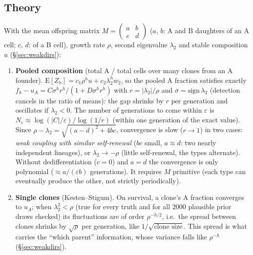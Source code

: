 \documentclass[10pt,a4paper]{article}
\begin{document}
\subsection{Theory}
With the mean offspring matrix $M = \begin{pmatrix} a & b\\ c & d\end{pmatrix}$ ($a$, $b$: A and B daughters of an A cell; $c$, $d$: of a B cell), growth rate $\rho$, second eigenvalue $\lambda_2$ and stable composition $u$ (\S\ref{sec:weakdirs}):
\begin{enumerate}
\item \textbf{Pooled composition} (total A / total cells over many clones from an A founder). $\mathrm E[Z_h] = c_1 \rho^h u + c_2 \lambda_2^h w_2$, so the pooled A fraction satisfies exactly $f_h - u_A = C\sigma^h r^h/(1 + D\sigma^h r^h)$ with $r = |\lambda_2|/\rho$ and $\sigma = \mathrm{sign}\,\lambda_2$ (detection cancels in the ratio of means): the gap shrinks by $r$ per generation and oscillates if $\lambda_2 < 0$. The number of generations to come within $\varepsilon$ is $N_\varepsilon \approx \log(|C|/\varepsilon)/\log(1/r)$ (within one generation of the exact value). Since $\rho - \lambda_2 = \sqrt{(a-d)^2 + 4bc}$, convergence is slow ($r \to 1$) in two cases: \emph{weak coupling with similar self-renewal} ($bc$ small, $a \approx d$: two nearly independent lineages), or $\lambda_2 \to -\rho$ (little self-renewal, the types alternate). Without dedifferentiation ($c = 0$) and $a = d$ the convergence is only polynomial ($\approx a/(\varepsilon b)$ generations). It requires $M$ primitive (each type can eventually produce the other, not strictly periodically).
\item \textbf{Single clones} (Kesten--Stigum). On survival, a clone's A fraction converges to $u_A$; when $\lambda_2^2 < \rho$ (true for every truth and for all 2000 plausible prior draws checked) its fluctuations are of order $\rho^{-h/2}$, i.e.\ the spread between clones shrinks by $\sqrt\rho$ per generation, like $1/\sqrt{\text{clone size}}$. This spread is what carries the ``which parent'' information, whose variance falls like $\rho^{-h}$ (\S\ref{sec:weakdirs}).
\end{enumerate}
\end{document}
